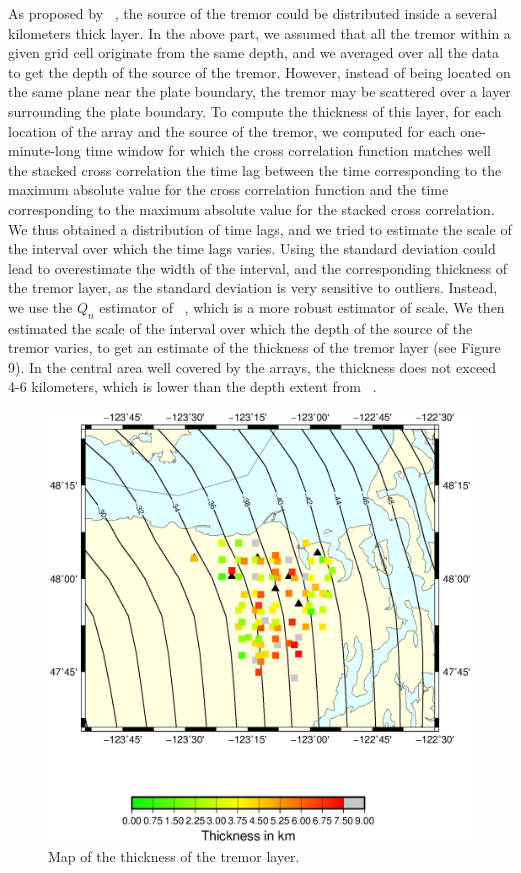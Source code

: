 \documentclass[draft]{agujournal2019}
\begin{document}
As proposed by ~\cite{KAO_2009}, the source of the tremor could be distributed inside a several kilometers thick layer. In the above part, we assumed that all the tremor within a given grid cell originate from the same depth, and we averaged over all the data to get the depth of the source of the tremor. However, instead of being located on the same plane near the plate boundary, the tremor may be scattered over a layer surrounding the plate boundary. To compute the thickness of this layer, for each location of the array and the source of the tremor, we computed for each one-minute-long time window for which the cross correlation function matches well the stacked cross correlation the time lag between the time corresponding to the maximum absolute value for the cross correlation function and the time corresponding to the maximum absolute value for the stacked cross correlation. We thus obtained a distribution of time lags, and we tried to estimate the scale of the interval over which the time lags varies. Using the standard deviation could lead to overestimate the width of the interval, and the corresponding thickness of the tremor layer, as the standard deviation is very sensitive to outliers. Instead, we use the $Q_n$ estimator of ~, which is a more robust estimator of scale. We then estimated the scale of the interval over which the depth of the source of the tremor varies, to get an estimate of the thickness of the tremor layer (see Figure 9). In the central area well covered by the arrays, the thickness does not exceed 4-6 kilometers, which is lower than the depth extent from ~.

\begin{figure}
\noindent\includegraphics[width=\textwidth, trim={1cm 5cm 2cm 6cm},clip]{figures/Q_PWS_PWS.eps}
\caption{Map of the thickness of the tremor layer.}
\label{pngfiguresample}
\end{figure}
\end{document}
